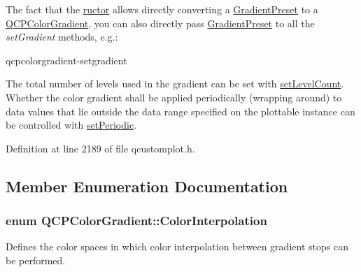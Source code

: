 The fact that the \hyperlink{class_q_c_p_color_gradient}{ructor} allows directly converting a \hyperlink{class_q_c_p_color_gradient_aed6569828fee337023670272910c9072}{Gradient\+Preset} to a \hyperlink{class_q_c_p_color_gradient}{Q\+C\+P\+Color\+Gradient}, you can also directly pass \hyperlink{class_q_c_p_color_gradient_aed6569828fee337023670272910c9072}{Gradient\+Preset} to all the {\itshape set\+Gradient} methods, e.\+g.\+: 
\begin{DoxyCodeInclude}
\end{DoxyCodeInclude}
qcpcolorgradient-\/setgradient

The total number of levels used in the gradient can be set with \hyperlink{class_q_c_p_color_gradient_a18da587eb4f7fc788ea28ba15b6a12de}{set\+Level\+Count}. Whether the color gradient shall be applied periodically (wrapping around) to data values that lie outside the data range specified on the plottable instance can be controlled with \hyperlink{class_q_c_p_color_gradient_a39d6448155fc00a219f239220d14bb39}{set\+Periodic}. 

Definition at line 2189 of file qcustomplot.\+h.



\subsection{Member Enumeration Documentation}
\hypertarget{class_q_c_p_color_gradient_ac5dca17cc24336e6ca176610e7f77fc1}{}
\subsubsection[{Color\+Interpolation}]{\setlength{\rightskip}{0pt plus 5cm}enum {\bf Q\+C\+P\+Color\+Gradient\+::\+Color\+Interpolation}}\label{class_q_c_p_color_gradient_ac5dca17cc24336e6ca176610e7f77fc1}
Defines the color spaces in which color interpolation between gradient stops can be performed.

